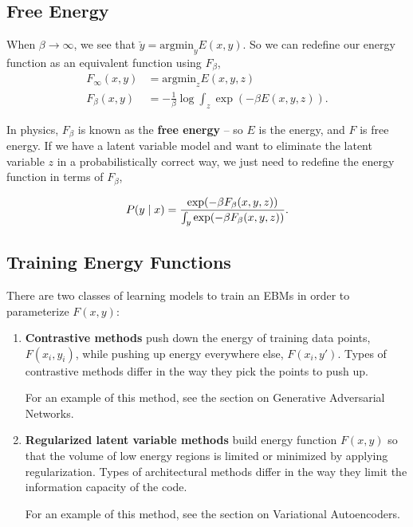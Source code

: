 \documentclass{article}
\begin{document}
\subsection{Free Energy}

When $\beta \rightarrow \infty$, we see that $\check{y} = \text{argmin}_{y} E(x,y)$. So we can redefine our energy function as an equivalent function using $F_\beta$,
\begin{align*}
    F_{\infty} (x,y) &= \text{argmin}_z E(x,y,z)\\
    F_{\beta} (x,y) &= -\frac{1}{\beta} \log \int_z \exp(-\beta E(x,y,z)).
\end{align*}

In physics, $F_\beta$ is known as the \textbf{free energy} -- so $E$ is the energy, and $F$ is free energy. If we have a latent variable model and want to eliminate the latent variable $z$ in a probabilistically correct way, we just need to redefine the energy function in terms of $F_\beta$,

\[
    P(y \mid x) = \frac{ \exp(-\beta F_\beta(x,y,z)) }{ \int_y \exp(-\beta F_\beta(x, y, z))}. \\
\]

\subsection{Training Energy Functions}

There are two classes of learning models to train an EBMs in order to parameterize $F(x, y)$:

\begin{enumerate}
    \item \textbf{Contrastive methods} push down the energy of training data points, $F(x_i, y_i)$, while pushing up energy everywhere else, $F(x_i, y')$. Types of contrastive methods differ in the way they pick the points to push up.
    
    For an example of this method, see the section on Generative Adversarial Networks.
    
    \item \textbf{Regularized latent variable methods} build energy function $F(x, y)$ so that the volume of low energy regions is limited or minimized by applying regularization. Types of architectural methods differ in the way they limit the information capacity of the code.
    
    For an example of this method, see the section on Variational Autoencoders.
\end{enumerate}
\end{document}
